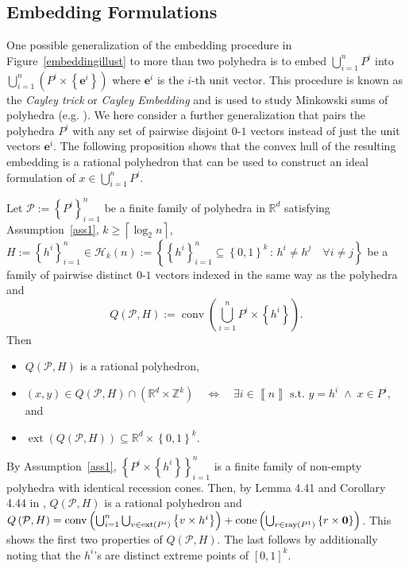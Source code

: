 \documentclass[mnsc]{informs3}
\newcommand{\set}[1]{\left\{#1\right\}}                     %
\newcommand{\bra}[1]{\left(#1\right)}
\newcommand{\sidx}[1]{\left\llbracket     #1 \right\rrbracket}
\newcommand{\Real}{\mathbb R}
\newcommand{\e}{\mathbf{e}}
\newcommand{\Int}{\mathbb Z}
\DeclareMathOperator{\conv}{conv}
\DeclareMathOperator{\ext}{ext}
\DeclareMathOperator{\ray}{ray}
\DeclareMathOperator{\cone}{cone}
\begin{document}
\subsection{Embedding Formulations}

One possible generalization of the embedding procedure in Figure~\ref{embeddingillust} to more than two polyhedra is to embed $\bigcup_{i=1}^n P^i$ into $\bigcup_{i=1}^n \bra{ P^i \times \set{\e^i}}$ where $\e^i$ is the $i$-th unit vector. This procedure is known as the \emph{Cayley trick} or \emph{Cayley Embedding} and is used to study Minkowski sums of polyhedra (e.g. \cite{caytrick,karavelas2013maximum,WeibelPhd}). We here consider a further generalization that pairs the polyhedra $P^i$ with any set of pairwise disjoint $0$-$1$ vectors instead of just the unit vectors $\e^i$. The following proposition shows that the convex hull of the resulting embedding is a rational polyhedron that can be used to construct an ideal formulation of $x\in \bigcup_{i=1}^n P^i$. 

\begin{proposition}\label{firstprop} Let $\mathcal{P}:=\set{P^i}_{i=1}^n$ be a finite family of polyhedra in $\Real^d$ satisfying Assumption~\ref{ass1}, $k\geq \left\lceil \log_2 n\right\rceil$,  
$H:=\set{h^i}_{i=1}^n\in \mathcal{H}_k(n):=\set{\set{h^i}_{i=1}^n\subseteq \set{0,1}^k\,:\,  h^i\neq h^j \quad \forall i\neq j}$
be a family of pairwise distinct $0$-$1$ vectors indexed in the same way as the polyhedra and
\begin{equation}\label{embconv}
Q\bra{\mathcal{P},H}:=\conv\bra{\bigcup_{i=1}^n P^i\times \set{h^i} }.
\end{equation}
 Then 
\begin{itemize}
\item $Q\bra{\mathcal{P},H}$ is a rational polyhedron,
\item $ \bra{x,y}\in Q\bra{\mathcal{P},H} \cap \bra{\Real^d\times\Int^k} \quad \Leftrightarrow \quad\exists i\in \sidx{n} \text{ s.t. } y=h^i\;\wedge\; x\in P^i,$ and
\item $\ext\bra{Q\bra{\mathcal{P},H}}\subseteq \Real^d\times \set{0,1}^k$.
\end{itemize}
\end{proposition}
By Assumption~\ref{ass1},  $\set{P^i\times \set{h^i}}_{i=1}^n$ is a finite family of non-empty polyhedra with identical recession cones. Then, by Lemma 4.41 and Corollary 4.44  in \cite{conforti2014integer}, $Q\bra{\mathcal{P},H}$ is a rational polyhedron and
$Q\bra{\mathcal{P},H}=\conv\bra{\bigcup_{i=1}^n \bigcup_{v\in \ext\bra{P^i}  }\set{v\times h^i}}+\cone\bra{ \bigcup_{r\in \ray\bra{P^1}  }\set{r\times {\bf 0}}}$.
This shows the first two properties of $Q\bra{\mathcal{P},H}$. The last follows by additionally noting that the $h^i$'s are distinct extreme points of $[0,1]^k$.
\Halmos\endproof
\end{document}
